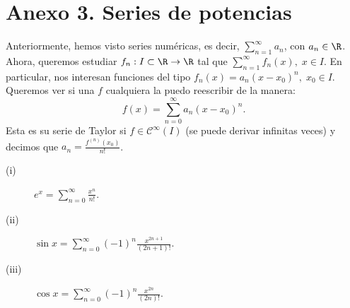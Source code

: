 \section{Anexo 3. Series de potencias}

Anteriormente, hemos visto series numéricas, es decir, $\displaystyle \sum^{\infty}_{n = 1}a_{n} $, con $\displaystyle a_{n} \in \R $. Ahora, queremos estudiar $\displaystyle f_{n} : I \subset \R \to \R $ tal que $\displaystyle \sum^{\infty}_{n = 1}f_{n}\left(x\right), \; x \in I $. En particular, nos interesan funciones del tipo $\displaystyle f_{n}\left(x\right) = a_{n}\left(x-x_{0}\right)^{n}, \; x_{0} \in I $. Queremos ver si una $\displaystyle f $ cualquiera la puedo reescribir de la manera:
\[f\left(x\right) = \sum^{\infty}_{ n = 0}a_{n}\left(x-x_{0}\right)^{n} .\]
Esta es su serie de Taylor si $\displaystyle f \in \mathcal{C}^{\infty}\left(I\right) $ (se puede derivar infinitas veces) y decimos que $\displaystyle a_{n} = \frac{ f^{\left(n\right)}\left(x_{0}\right)}{n!}$.
\begin{eg}
\normalfont 
\begin{description}
\item[(i)] $\displaystyle e^{x} = \sum^{\infty}_{n = 0}\frac{x^{n}}{n!} $.
\item[(ii)] $\displaystyle \sin x = \sum^{\infty}_{n = 0}\left(-1\right)^{n}\frac{x^{2n+1}}{\left(2n+1\right)!} $.
\item[(iii)] $\displaystyle \cos x = \sum^{\infty}_{ n = 0}\left(-1\right)^{n}\frac{x^{2n}}{\left(2n\right)!}$.
\end{description}

\end{eg}

